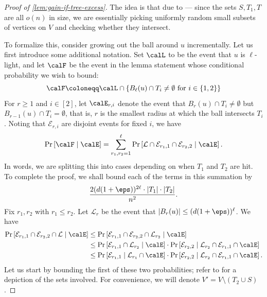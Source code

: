 \documentclass[11pt,letterpaper]{article}
\begin{document}
\begin{proof}[Proof of \cref{lem:gain-if-tree-excess}] 
    The idea is that due to  --- since the sets $S, T_1, T$ are all $o(n)$ in size, we are essentially picking uniformly random small subsets of vertices on $V$ and checking whether they intersect.

    To formalize this, consider growing out the ball around $u$ incrementally. 
    Let us first introduce some additional notation. 
    Set $\calL$ to be the event that $u$ is $\ell$-light, and let $\calF$ be the event in the lemma statement whose conditional probability we wish to bound: 
    \[
        \calF \coloneqq \calL \cap \{B_{\ell}(u) \cap T_i \ne \emptyset \text{ for } i \in \{1, 2\}\}
    \]For $r \ge 1$ and $i \in [2]$, let $\calE_{r, i}$ denote the event that $B_r(u) \cap T_i \ne \emptyset$ but $B_{r-1}(u) \cap T_i = \emptyset$, that is, $r$ is the smallest radius at which the ball intersects $T_i$. Noting that $\mathcal{E}_{r,i}$ are disjoint events for fixed $i$, we have
    \begin{equation}
        \Pr\left[ \calF \mid \calE \right] = \sum_{r_1,r_2=1}^{\ell} \Pr\left[ \mathcal{L} \cap \mathcal{E}_{r_1,1} \cap \mathcal{E}_{r_2,2} \mid \calE \right]. \label{eq:4.6-main}
    \end{equation}
    In words, we are splitting this into cases depending on when $T_1$ and $T_2$ are hit.
    To complete the proof, we shall bound each of the terms in this summation by
    \[ \frac{2(d(1+\eps))^{2\ell} \cdot |T_1| \cdot |T_2|}{n^2}. \]
    Fix $r_1,r_2$ with $r_1 \le r_2$. Let $\mathcal{L}_{r}$ be the event that $|B_{r}(u)| \le (d(1+\eps))^{\ell}$. We have
    \begin{align*}
        \Pr\left[ \mathcal{E}_{r_1,1} \cap \mathcal{E}_{r_2,2} \cap \mathcal{L} \mid \calE \right] &\le \Pr\left[ \mathcal{E}_{r_1,1} \cap \mathcal{E}_{r_2,2} \cap \mathcal{L}_{r_2} \mid \calE \right] \\
            &\le \Pr\left[ \mathcal{E}_{r_1,1} \cap \mathcal{L}_{r_2} \mid \calE \right] \cdot \Pr\left[ \mathcal{E}_{r_2,2} \mid \mathcal{L}_{r_2} \cap \mathcal{E}_{r_1,1} \cap \calE \right] \\
            &\le \Pr\left[ \mathcal{E}_{r_1,1} \mid \mathcal{L}_{r_1} \cap \calE \right] \cdot \Pr\left[ \mathcal{E}_{r_2,2} \mid \mathcal{L}_{r_2} \cap \mathcal{E}_{r_1,1} \cap \calE\right].
    \end{align*}
    Let us start by bounding the first of these two probabilities; refer to  for a depiction of the sets involved. For convenience, we will denote $V' = V \setminus (T_2 \cup S)$. 

\end{proof}
\end{document}
